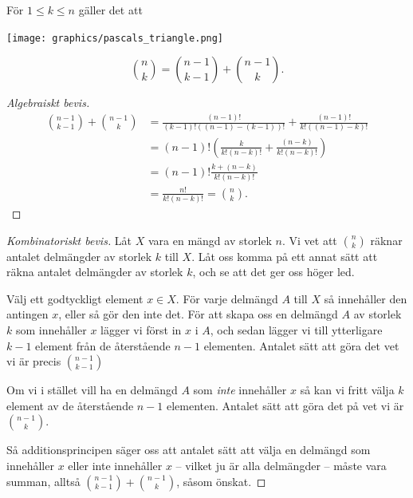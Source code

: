 \documentclass{tufte-handout}
\begin{document}
\begin{proposition}
  För $1 \leq k \leq n$ gäller det att
  
  \begin{marginfigure}
    \texttt{[image: graphics/pascals\_triangle.png]}
  \end{marginfigure}
  $$\binom{n}{k} = \binom{n-1}{k-1} + \binom{n-1}{k}.$$

  \begin{proof}[Algebraiskt bevis]
    \begin{align*}
      \binom{n-1}{k-1} + \binom{n-1}{k} &= \frac{(n-1)!}{(k-1)!((n-1)-(k-1))!} + \frac{(n-1)!}{k!((n-1)-k)!}\\
      &= (n-1)!\left(\frac{k}{k!(n-k)!} + \frac{(n-k)}{k!(n-k)!}\right)\\
      &= (n-1)!\frac{k + (n - k)}{k!(n-k)!}\\
      &= \frac{n!}{k!(n-k)!} = \binom{n}{k}.
    \end{align*}    
  \end{proof}

  \begin{proof}[Kombinatoriskt bevis]
    Låt $X$ vara en mängd av storlek $n$. Vi vet att $\binom{n}{k}$ räknar antalet delmängder av storlek $k$ till $X$. Låt oss komma på ett annat sätt att räkna antalet delmängder av storlek $k$, och se att det ger oss höger led.

    Välj ett godtyckligt element $x \in X$. För varje delmängd $A$ till $X$ så innehåller den antingen $x$, eller så gör den inte det. För att skapa oss en delmängd $A$ av storlek $k$ som innehåller $x$ lägger vi först in $x$ i $A$, och sedan lägger vi till ytterligare $k-1$ element från de återstående $n-1$ elementen. Antalet sätt att göra det vet vi är precis $\binom{n-1}{k-1}$

    Om vi i stället vill ha en delmängd $A$ som \emph{inte} innehåller $x$ så kan vi fritt välja $k$ element av de återstående $n-1$ elementen. Antalet sätt att göra det på vet vi är $\binom{n-1}{k}$.

    Så additionsprincipen säger oss att antalet sätt att välja en delmängd som innehåller $x$ eller inte innehåller $x$ -- vilket ju är alla delmängder -- måste vara summan, alltså $\binom{n-1}{k-1} + \binom{n-1}{k}$, såsom önskat.
  \end{proof}
\end{proposition}
\end{document}
